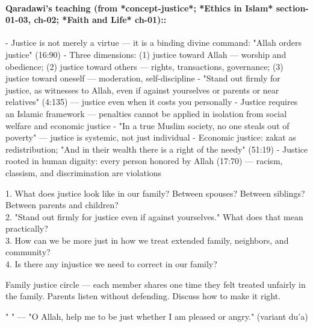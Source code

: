 \documentclass[11pt,a4paper]{article}
\begin{document}
\paragraph*{Qaradawi's teaching (from *concept-justice*; *Ethics in Islam* section-01-03, ch-02; *Faith and Life* ch-01)::}  - Justice is not merely a virtue --- it is a binding divine command: "Allah orders justice" (16:90) - Three dimensions: (1) justice toward Allah --- worship and obedience; (2) justice toward others --- rights, transactions, governance; (3) justice toward oneself --- moderation, self-discipline - "Stand out firmly for justice, as witnesses to Allah, even if against yourselves or parents or near relatives" (4:135) --- justice even when it costs you personally - Justice requires an Islamic framework --- penalties cannot be applied in isolation from social welfare and economic justice - "In a true Muslim society, no one steals out of poverty" --- justice is systemic, not just individual - Economic justice: zakat as redistribution; "And in their wealth there is a right of the needy" (51:19) - Justice rooted in human dignity: every person honored by Allah (17:70) --- racism, classism, and discrimination are violations

\begin{discussionbox} 1. What does justice look like in our family? Between spouses? Between siblings? Between parents and children? \\ 2. "Stand out firmly for justice even if against yourselves." What does that mean practically? \\ 3. How can we be more just in how we treat extended family, neighbors, and community? \\ 4. Is there any injustice we need to correct in our family? \end{discussionbox}

\begin{activitybox} Family justice circle --- each member shares one time they felt treated unfairly in the family. Parents listen without defending. Discuss how to make it right. \end{activitybox}

\begin{duabox} "       " --- "O Allah, help me to be just whether I am pleased or angry." (variant du'a) \end{duabox}
\end{document}
